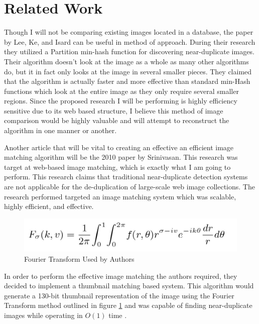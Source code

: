\documentclass[11pt]{article}
\begin{document}
\section{Related Work}
\label{sec:relatedwork}
\vspace*{-.1in}


Though I will not be comparing existing images located in a database, the paper by Lee, Ke, and Isard \cite{Lee:2010} can be useful in method of approach. During their research they utilized a Partition min-hash function for discovering near-duplicate images. Their algorithm doesn't look at the image as a whole as many other algorithms do, but it in fact only looks at the image in several smaller pieces. They claimed that the algorithm is actually faster and more effective than standard min-Hash functions which look at the entire image as they only require several smaller regions. Since the proposed research I will be performing is highly efficiency sensitive due to its web based structure, I believe this method of image comparison would be highly valuable and will attempt to reconstruct the algorithm in one manner or another.

Another article that will be vital to creating an effective an efficient image matching algorithm will be the 2010 paper by Srinivasan. This research was target at web-based image matching, which is exactly what I am going to perform. This research claims that traditional near-duplicate detection systems are not applicable for the de-duplication of large-scale web image collections. \cite{Srinivasan:2008} The research performed targeted an image matching system which was scalable, highly efficient, and effective.

\begin{figure}[htbp]
\centering
\includegraphics[width=4.5in]{fourierTrans}
\caption{Fourier Transform Used by Authors}
\label{related-fourier}
\end{figure}

In order to perform the effective image matching the authors required, they decided to implement a thumbnail matching based system. This algorithm would generate a 130-bit thumbnail representation of the image using the Fourier Transform method outlined in figure \ref{related-fourier} and was capable of finding near-duplicate images while operating in $O(1)$ time \cite{Srinivasan:2008}.
\end{document}
